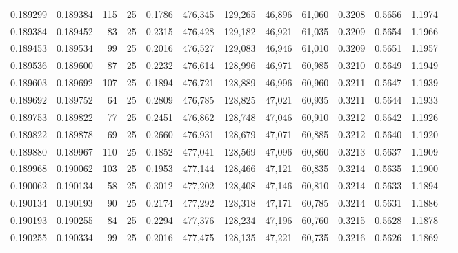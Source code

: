 \begin{tabular}{rrrrrrrrrrrrr}
0.189299 & 0.189384 &   115 &  25 &                                     0.1786 & 476,345 & 129,265 &  46,896 &  61,060 & 0.3208 & 0.5656 & 1.1974 \\
0.189384 & 0.189452 &    83 &  25 &                                     0.2315 & 476,428 & 129,182 &  46,921 &  61,035 & 0.3209 & 0.5654 & 1.1966 \\
0.189453 & 0.189534 &    99 &  25 &                                     0.2016 & 476,527 & 129,083 &  46,946 &  61,010 & 0.3209 & 0.5651 & 1.1957 \\
0.189536 & 0.189600 &    87 &  25 &                                     0.2232 & 476,614 & 128,996 &  46,971 &  60,985 & 0.3210 & 0.5649 & 1.1949 \\
0.189603 & 0.189692 &   107 &  25 &                                     0.1894 & 476,721 & 128,889 &  46,996 &  60,960 & 0.3211 & 0.5647 & 1.1939 \\
0.189692 & 0.189752 &    64 &  25 &                                     0.2809 & 476,785 & 128,825 &  47,021 &  60,935 & 0.3211 & 0.5644 & 1.1933 \\
0.189753 & 0.189822 &    77 &  25 &                                     0.2451 & 476,862 & 128,748 &  47,046 &  60,910 & 0.3212 & 0.5642 & 1.1926 \\
0.189822 & 0.189878 &    69 &  25 &                                     0.2660 & 476,931 & 128,679 &  47,071 &  60,885 & 0.3212 & 0.5640 & 1.1920 \\
0.189880 & 0.189967 &   110 &  25 &                                     0.1852 & 477,041 & 128,569 &  47,096 &  60,860 & 0.3213 & 0.5637 & 1.1909 \\
0.189968 & 0.190062 &   103 &  25 &                                     0.1953 & 477,144 & 128,466 &  47,121 &  60,835 & 0.3214 & 0.5635 & 1.1900 \\
0.190062 & 0.190134 &    58 &  25 &                                     0.3012 & 477,202 & 128,408 &  47,146 &  60,810 & 0.3214 & 0.5633 & 1.1894 \\
0.190134 & 0.190193 &    90 &  25 &                                     0.2174 & 477,292 & 128,318 &  47,171 &  60,785 & 0.3214 & 0.5631 & 1.1886 \\
0.190193 & 0.190255 &    84 &  25 &                                     0.2294 & 477,376 & 128,234 &  47,196 &  60,760 & 0.3215 & 0.5628 & 1.1878 \\
0.190255 & 0.190334 &    99 &  25 &                                     0.2016 & 477,475 & 128,135 &  47,221 &  60,735 & 0.3216 & 0.5626 & 1.1869 \\

\end{tabular}
